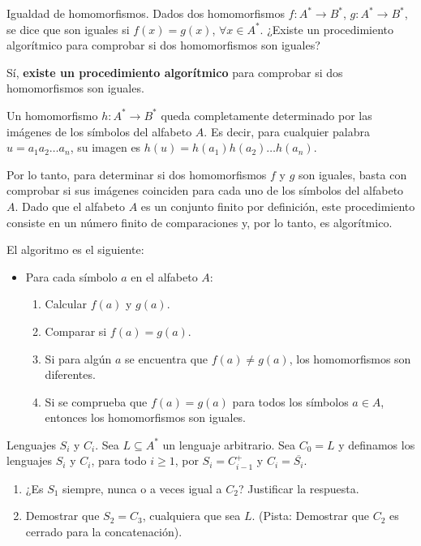 \documentclass[12pt]{report} %
\begin{document}
\begin{ejercicio}
Igualdad de homomorfismos. Dados dos homomorfismos $f : A^* \to B^*$, $g : A^* \to B^*$, se dice que son iguales si $f(x) = g(x)$, $\forall x \in A^*$. ¿Existe un procedimiento algorítmico para comprobar si dos homomorfismos son iguales?
\end{ejercicio}

\begin{solucion}

Sí, \textbf{existe un procedimiento algorítmico} para comprobar si dos homomorfismos son iguales.

Un homomorfismo \( h: A^* \to B^* \) queda completamente determinado por las imágenes de los símbolos del alfabeto \( A \). Es decir, para cualquier palabra \( u = a_1a_2\ldots a_n \), su imagen es \( h(u) = h(a_1)h(a_2)\ldots h(a_n) \).

Por lo tanto, para determinar si dos homomorfismos \( f \) y \( g \) son iguales, basta con comprobar si sus imágenes coinciden para cada uno de los símbolos del alfabeto \( A \). Dado que el alfabeto \( A \) es un conjunto finito por definición, este procedimiento consiste en un número finito de comparaciones y, por lo tanto, es algorítmico.

El algoritmo es el siguiente:
\begin{itemize}
    \item Para cada símbolo \( a \) en el alfabeto \( A \):
    \begin{enumerate}
        \item Calcular \( f(a) \) y \( g(a) \).
        \item Comparar si \( f(a) = g(a) \).
        \item Si para algún \( a \) se encuentra que \( f(a) \neq g(a) \), los homomorfismos son diferentes.
        \item Si se comprueba que \( f(a) = g(a) \) para todos los símbolos \( a \in A \), entonces los homomorfismos son iguales.
    \end{enumerate}
\end{itemize}

\end{solucion}

\begin{ejercicio}
Lenguajes $S_i$ y $C_i$. 
Sea $L \subseteq A^*$ un lenguaje arbitrario. Sea $C_0 = L$ y definamos los lenguajes $S_i$ y $C_i$, para todo $i \geq 1$, por $S_i = C_{i-1}^+$ y $C_i = \overline{S_i}$. 

\begin{enumerate}[label=\alph*)]
    \item ¿Es $S_1$ siempre, nunca o a veces igual a $C_2$? Justificar la respuesta.  

    \item Demostrar que $S_2 = C_3$, cualquiera que sea $L$. (Pista: Demostrar que $C_2$ es cerrado para la concatenación).
\end{enumerate}

\end{ejercicio}
\end{document}
